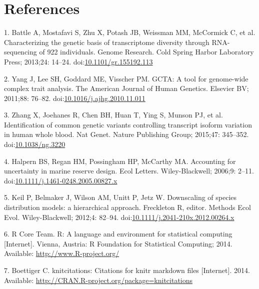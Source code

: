 \documentclass[]{article}
\begin{document}
\section*{References}\label{references}

1. Battle A, Mostafavi S, Zhu X, Potash JB, Weissman MM, McCormick C, et
al. Characterizing the genetic basis of transcriptome diversity through
RNA-sequencing of 922 individuals. Genome Research. Cold Spring Harbor
Laboratory Press; 2013;24: 14--24.
doi:\href{http://dx.doi.org/10.1101/gr.155192.113}{10.1101/gr.155192.113}

2. Yang J, Lee SH, Goddard ME, Visscher PM. GCTA: A tool for genome-wide
complex trait analysis. The American Journal of Human Genetics. Elsevier
BV; 2011;88: 76--82.
doi:\href{http://dx.doi.org/10.1016/j.ajhg.2010.11.011}{10.1016/j.ajhg.2010.11.011}

3. Zhang X, Joehanes R, Chen BH, Huan T, Ying S, Munson PJ, et al.
Identification of common genetic variants controlling transcript isoform
variation in human whole blood. Nat Genet. Nature Publishing Group;
2015;47: 345--352.
doi:\href{http://dx.doi.org/10.1038/ng.3220}{10.1038/ng.3220}

4. Halpern BS, Regan HM, Possingham HP, McCarthy MA. Accounting for
uncertainty in marine reserve design. Ecol Letters. Wiley-Blackwell;
2006;9: 2--11.
doi:\href{http://dx.doi.org/10.1111/j.1461-0248.2005.00827.x}{10.1111/j.1461-0248.2005.00827.x}

5. Keil P, Belmaker J, Wilson AM, Unitt P, Jetz W. Downscaling of
species distribution models: a hierarchical approach. Freckleton R,
editor. Methods Ecol Evol. Wiley-Blackwell; 2012;4: 82--94.
doi:\href{http://dx.doi.org/10.1111/j.2041-210x.2012.00264.x}{10.1111/j.2041-210x.2012.00264.x}

6. R Core Team. R: A language and environment for statistical computing
{[}Internet{]}. Vienna, Austria: R Foundation for Statistical Computing;
2014. Available: \url{http://www.R-project.org/}

7. Boettiger C. knitcitations: Citations for knitr markdown files
{[}Internet{]}. 2014. Available:
\url{http://CRAN.R-project.org/package=knitcitations}
\end{document}
